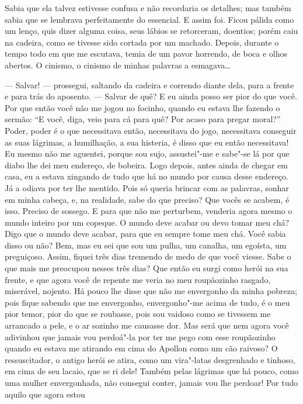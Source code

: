 Sabia que ela talvez estivesse confusa e não recordaria os detalhes; mas
também sabia que se lembrava perfeitamente do essencial. E assim foi.
Ficou pálida como um lenço, quis dizer alguma coisa, seus lábios se
retorceram, doentios; porém caiu na cadeira, como se tivesse sido
cortada por um machado. Depois, durante o tempo todo em que me escutava,
temia de um pavor horrendo, de boca e olhos abertos. O cinismo, o
cinismo de minhas palavras a esmagava\ldots{}

--- Salvar! --- prossegui, saltando da cadeira e correndo diante dela, para
a frente e para trás do aposento. --- Salvar de quê? E eu ainda posso ser
pior do que você. Por que então você não me jogou no focinho, quando eu
estava lhe fazendo o sermão: ``E você, diga, veio para cá para quê? Por
acaso para pregar moral?'' Poder, poder é o que necessitava então,
necessitava do jogo, necessitava conseguir as suas lágrimas, a
humilhação, a sua histeria, é disso que eu então necessitava! Eu mesmo
não me aguentei, porque sou sujo, assustei"-me e sabe"-se lá por que diabo
lhe dei meu endereço, de bobeira. Logo depois, antes ainda de chegar em
casa, eu a estava xingando de tudo que há no mundo por causa desse
endereço. Já a odiava por ter lhe mentido. Pois só queria brincar com as
palavras, sonhar em minha cabeça, e, na realidade, sabe do que preciso?
Que vocês se acabem, é isso. Preciso de sossego. E para que não me
perturbem, venderia agora mesmo o mundo inteiro por um copeque. O mundo
deve acabar ou devo tomar meu chá? Digo que o mundo deve acabar, para
que eu sempre tome meu chá. Você sabia disso ou não? Bem, mas eu sei que
sou um pulha, um canalha, um egoísta, um preguiçoso. Assim, fiquei três
dias tremendo de medo de que você viesse. Sabe o que mais me preocupou
nesses três dias? Que então eu surgi como herói na sua frente, e que
agora você de repente me veria no meu roupãozinho rasgado, miserável,
nojento. Há pouco lhe disse que não me envergonho da minha pobreza; pois
fique sabendo que me envergonho, envergonho"-me acima de tudo, é o meu
pior temor, pior do que se roubasse, pois sou vaidoso como se tivessem
me arrancado a pele, e o ar sozinho me causasse dor. Mas será que nem
agora você adivinhou que jamais vou perdoá"-la por ter me pego com esse
roupãozinho quando eu estava me atirando em cima do Apollon como um cão
raivoso? O ressuscitador, o antigo herói se atira, como um vira"-latas
desgrenhado e tinhoso, em cima de seu lacaio, que se ri dele! Também
pelas lágrimas que há pouco, como uma mulher envergonhada, não consegui
conter, jamais vou lhe perdoar! Por tudo aquilo que agora estou

